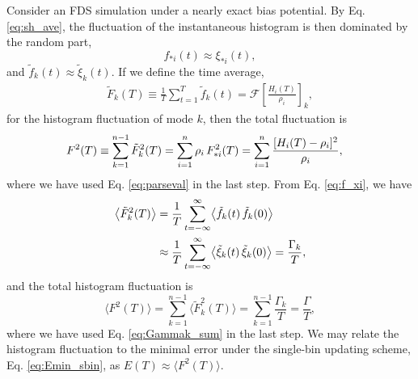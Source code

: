 \documentclass[reprint, superscriptaddress, floatfix]{revtex4-1}
\newcommand{\Err}{E}
\begin{document}
Consider an FDS simulation
under a nearly exact bias potential.
%
By Eq. \eqref{eq:sh_ave},
the fluctuation of the instantaneous histogram
is then dominated by the random part,
%
\begin{equation}
  f_{*i}(t) \approx \xi_{*i}(t)
  ,
  \label{eq:f_xi}
\end{equation}
and
$\tilde f_k(t) \approx \tilde \xi_k(t).$
%
If we define the time average,
%
\begin{align*}
  \tilde F_k(T) \equiv \frac 1 T \sum_{t = 1}^T \tilde f_k(t)
  =\mathcal F\left[ \frac{ H_i(T) } { \rho_i } \right]_k
  ,
\end{align*}
%
for the histogram fluctuation of mode $k$,
then the total fluctuation is
%
\begin{align}
  F^2(T)
  &\equiv
  \sum_{k=1}^{n-1} \tilde F_k^2(T)
  =
  \sum_{i=1}^{n} \rho_i \, F_{*i}^2(T)
  =
  \sum_{i=1}^n
  \frac{ [ H_i(T) -\rho_i]^2 }{\rho_i}
  ,
  \notag
\end{align}
%
where we have used Eq. \eqref{eq:parseval} in the last step.
%
From Eq. \eqref{eq:f_xi}, we have
%
\begin{align}
  \bigl\langle \tilde F_k^2(T) \bigr\rangle
  &=
  \frac{1}{T}
  \sum_{t=-\infty}^\infty
  \bigl\langle
    \tilde f_k(t) \, \tilde f_k(0)
  \bigr\rangle
  \notag \\
  &\approx
  \frac{1}{T}
  \sum_{t=-\infty}^\infty
  \bigl\langle
    \tilde \xi_k(t) \, \tilde \xi_k(0)
  \bigr\rangle
  =
  \frac{ \Gamma_k } { T }
  ,
  \label{eq:Fk2_Gammak}
\end{align}
%
and the total histogram fluctuation is
\begin{equation}
  \bigl\langle F^2(T) \bigr\rangle
  =
  \sum_{k=1}^{n-1}
  \bigl\langle \tilde F_k^2(T) \bigr\rangle
  =
  \sum_{k=1}^{n-1}
  \frac{ \Gamma_k } { T }
  =
  \frac{ \Gamma } { T }
  ,
  \label{eq:F2sum}
\end{equation}
where we have used Eq. \eqref{eq:Gammak_sum}
in the last step.
%
We may relate the histogram fluctuation
to the minimal error under the single-bin updating scheme,
Eq. \eqref{eq:Emin_sbin}, as
  $\Err(T) \approx \bigl\langle F^2(T) \bigr\rangle$.
%
\end{document}
